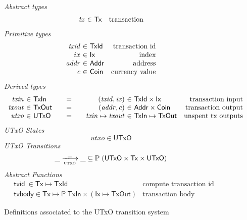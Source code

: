 \documentclass[11pt,a4paper]{article}
\newcommand{\powerset}[1]{\mathbb{P}~#1}
\newcommand{\var}[1]{\mathit{#1}}
\newcommand{\fun}[1]{\mathsf{#1}}
\newcommand{\type}[1]{\mathsf{#1}}
\newcommand{\trans}[2]{\xlongrightarrow[\textsc{#1}]{#2}}
\newcommand{\Tx}{\type{Tx}}
\newcommand{\Ix}{\type{Ix}}
\newcommand{\TxId}{\type{TxId}}
\newcommand{\Addr}{\type{Addr}}
\newcommand{\UTxO}{\type{UTxO}}
\newcommand{\Coin}{\type{Coin}}
\newcommand{\TxIn}{\type{TxIn}}
\newcommand{\TxOut}{\type{TxOut}}
\newcommand{\txid}[1]{\fun{txid}~ \var{#1}}
\begin{document}
\begin{figure*}
  \emph{Abstract types}
  \begin{equation*}
    \begin{array}{r@{~\in~}lr}
      \var{tx} & \Tx & \text{transaction}\\
    \end{array}
  \end{equation*}
  \emph{Primitive types}
  \begin{equation*}
    \begin{array}{r@{~\in~}lr}
      \var{txid} & \TxId & \text{transaction id}\\
      ix & \Ix & \text{index}\\
      \var{addr} & \Addr & \text{address}\\
      c & \Coin & \text{currency value}
    \end{array}
  \end{equation*}
  \emph{Derived types}
  \begin{equation*}
    \begin{array}{r@{~\in~}l@{\qquad=\qquad}r@{~\in~}lr}
      \var{txin}
      & \TxIn
      & (\var{txid}, \var{ix})
      & \TxId \times \Ix
      & \text{transaction input}
      \\
      \var{txout}
      & \type{TxOut}
      & (\var{addr}, c)
      & \Addr \times \Coin
      & \text{transaction output}
      \\
      \var{utxo}
      & \UTxO
      & \var{txin} \mapsto \var{txout}
      & \TxIn \mapsto \TxOut
      & \text{unspent tx outputs}
    \end{array}
  \end{equation*}
  \emph{UTxO States}
  \begin{equation*}
    \var{utxo} \in \UTxO
  \end{equation*}
  \emph{UTxO Transitions}
  \begin{equation*}
    \var{\_} \trans{utxo}{\_} \var{\_}
    \subseteq \powerset (\UTxO \times \Tx \times \UTxO)
  \end{equation*}
  \emph{Abstract Functions}
  \begin{align*}
    & \txid{} \in \Tx \mapsto \TxId & \text{compute transaction id}\\
    & \fun{txbody} \in \Tx \mapsto \powerset{\TxIn} \times (\Ix \mapsto \TxOut)
    & \text{transaction body}
  \end{align*}
  \caption{Definitions associated to the UTxO transition system}
  \label{fig:state-trans-utxo-defs}
\end{figure*}
\end{document}
